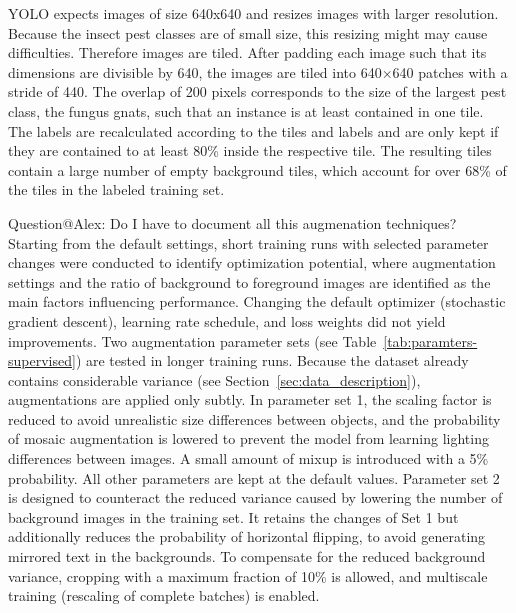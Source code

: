 \documentclass[12pt,a4paper]{article}
\begin{document}
YOLO expects images of size 640x640 and resizes images with larger resolution. Because the insect pest classes are of small size, this resizing might may cause difficulties. Therefore images are tiled. After padding each image such that its dimensions are divisible by 640, the images are tiled into 640×640 patches with a stride of 440. The overlap of 200 pixels corresponds to the size of the largest pest class, the fungus gnats, such that an instance is at least contained in one tile. The labels are recalculated according to the tiles and labels and are only kept if they are contained to at least 80\% inside the respective tile.  The resulting tiles contain a large number of empty background tiles, which account for over 68\% of the tiles in the labeled training set.

{\color{red} Question@Alex: Do I have to document all this augmenation techniques?}\\
Starting from the default settings, short training runs with selected parameter changes were conducted to identify optimization potential, where augmentation settings and the ratio of background to foreground images are identified as the main factors influencing performance. Changing the default optimizer (stochastic gradient descent), learning rate schedule, and loss weights did not yield improvements. Two augmentation parameter sets (see Table~\ref{tab:paramters-supervised}) are tested in longer training runs. Because the dataset already contains considerable variance (see Section~\ref{sec:data_description}), augmentations are applied only subtly. In parameter set 1, the scaling factor is reduced to avoid unrealistic size differences between objects, and the probability of mosaic augmentation is lowered to prevent the model from learning lighting differences between images. A small amount of mixup is introduced with a 5\% probability. All other parameters are kept at the default values. Parameter set 2 is designed to counteract the reduced variance caused by lowering the number of background images in the training set. It retains the changes of Set 1 but additionally reduces the probability of horizontal flipping, to avoid generating mirrored text in the backgrounds. To compensate for the reduced background variance, cropping with a maximum fraction of 10\% is allowed, and multiscale training (rescaling of complete batches) is enabled.
\end{document}
